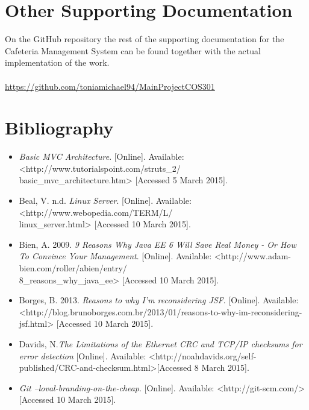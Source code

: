\documentclass[a4paper,12pt]{article}
\begin{document}
\section{Other Supporting Documentation}

On the GitHub repository the rest of the supporting documentation for the Cafeteria Management System can be found together with the actual implementation of the work. \\\\
 \url{https://github.com/toniamichael94/MainProjectCOS301}

\newpage
\section{Bibliography}
		\begin{itemize}
			\item \textit{Basic MVC Architecture}. [Online]. Available: <http://www.tutorialspoint.com/struts\_2/\\basic\_mvc\_architecture.htm> [Accessed 5 March 2015].
			
			\item Beal, V. n.d. \textit{Linux Server}. [Online]. Available: <http://www.webopedia.com/TERM/L/\\linux\_server.html> [Accessed 10 March 2015].

			\item Bien, A. 2009. \textit{9 Reasons Why Java EE 6 Will Save Real Money - Or How To Convince Your Management}. [Online]. Available: <http://www.adam-bien.com/roller/abien/entry/\\8\_reasons\_why\_java\_ee> [Accessed 10 March 2015].

			\item Borges, B. 2013. \textit{Reasons to why I'm reconsidering JSF}. [Online]. Available: <http://blog.brunoborges.com.br/2013/01/reasons-to-why-im-reconsidering-jsf.html> [Accessed 10 March 2015].
			
			\item Davids, N.\textit{The Limitations of the Ethernet CRC and TCP/IP checksums for error detection} [Online]. Available: 
			<http://noahdavids.org/self-published/CRC-and-checksum.html>[Accessed 8 March 2015].

			\item \textit{Git --loval-branding-on-the-cheap}. [Online]. Available: <http://git-scm.com/> [Accessed 10 March 2015].


\end{itemize}
\end{document}
